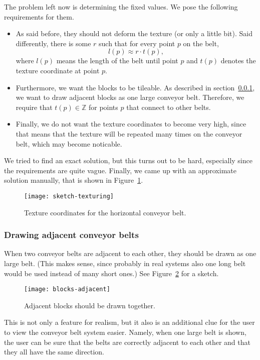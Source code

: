 The problem left now is determining the fixed values. We pose the following requirements for them.
\begin{itemize}
  \item As said before, they should not deform the texture (or only a little bit). Said differently, there is some $r$ such that for every point $p$ on the belt,
  \[
    l(p) \approx r \cdot t(p),
  \]
  where $l(p)$ means the length of the belt until point $p$ and $t(p)$ denotes the texture coordinate at point $p$.
  \item Furthermore, we want the blocks to be tileable. As described in section~\ref{subsubsec:drawing-adjacent}, we want to draw adjacent blocks as one large conveyor belt. Therefore, we require that $t(p) \in \mathbb{Z}$ for points $p$ that connect to other belts.
  \item Finally, we do not want the texture coordinates to become very high, since that means that the texture will be repeated many times on the conveyor belt, which may become noticable.
\end{itemize}
We tried to find an exact solution, but this turns out to be hard, especially since the requirements are quite vague. Finally, we came up with an approximate solution manually, that is shown in Figure~\ref{fig:sketch-texturing}.
\begin{figure}
  \begin{center}
    \texttt{[image: sketch-texturing]}
    \caption{Texture coordinates for the horizontal conveyor belt.}
    \label{fig:sketch-texturing}
  \end{center}
\end{figure}

\subsubsection{Drawing adjacent conveyor belts}
\label{subsubsec:drawing-adjacent}
When two conveyor belts are adjacent to each other, they should be drawn as one large belt. (This makes sense, since probably in real systems also one long belt would be used instead of many short ones.) See Figure~\ref{fig:blocks-adjacent} for a sketch.
\begin{figure}
  \begin{center}
    \texttt{[image: blocks-adjacent]}
    \caption{Adjacent blocks should be drawn together.}
    \label{fig:blocks-adjacent}
  \end{center}
\end{figure}

This is not only a feature for realism, but it also is an additional clue for the user to view the conveyor belt system easier. Namely, when one large belt is shown, the user can be sure that the belts are correctly adjacent to each other and that they all have the same direction.
